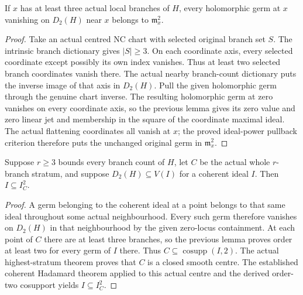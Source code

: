 \begin{lemma}
\label{hir:general-nc-double-locus-square-point-ideal}
\leanok
If $x$ has at least three actual local branches of $H$, every holomorphic
germ at $x$ vanishing on $D_2(H)$ near $x$ belongs to $\mathfrak m_x^2$.
\end{lemma}
\begin{proof}
Take an actual centred NC chart with selected original branch set $S$.
The intrinsic branch dictionary gives $|S|\geq3$. On each coordinate
axis, every selected coordinate except possibly its own index vanishes.
Thus at least two selected branch coordinates vanish there. The actual
nearby branch-count dictionary puts the inverse image of that axis in
$D_2(H)$. Pull the given holomorphic germ through the genuine chart
inverse. The resulting holomorphic germ at zero vanishes on every
coordinate axis, so the previous lemma gives its zero value and zero
linear jet and membership in the square of the coordinate maximal ideal.
The actual flattening coordinates all vanish at $x$; the proved ideal-power
pullback criterion therefore puts the unchanged original germ in
$\mathfrak m_x^2$.
\end{proof}

\begin{lemma}
\label{hir:general-nc-double-locus-ideal-square-highest-centre}
\leanok
Suppose $r\geq3$ bounds every branch count of $H$, let $C$ be the actual
whole $r$-branch stratum, and suppose $D_2(H)\subseteq V(I)$ for a coherent
ideal $I$. Then $I\subseteq I_C^2$.
\end{lemma}
\begin{proof}
A germ belonging to the coherent ideal at a point belongs to that same
ideal throughout some actual neighbourhood. Every such germ therefore
vanishes on $D_2(H)$ in that neighbourhood by the given zero-locus
containment. At each point of $C$ there are at least three branches, so
the previous lemma proves order at least two for every germ of $I$ there.
Thus $C\subseteq\operatorname{cosupp}(I,2)$. The actual highest-stratum
theorem proves that $C$ is a closed smooth centre. The established
coherent Hadamard theorem applied to this actual centre and the derived
order-two cosupport yields $I\subseteq I_C^2$.
\end{proof}

